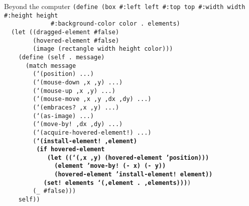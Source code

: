\begin{frame}{Beyond the computer}
  \tiny
  \texttt{(define (box \#:left left \#:top top \#:width width \#:height height\\
    \ \ \ \ \ \ \ \ \ \ \ \ \ \#:background-color color .\ elements)\\
    \ \ (let ((dragged-element \#false)\\
    \ \ \ \ \ \ \ \ (hovered-element \#false)\\
    \ \ \ \ \ \ \ \ (image (rectangle width height color)))\\
    \ \ \ \ (define (self .\ message)\\
    \ \ \ \ \ \ (match message\\
    \ \ \ \ \ \ \ \ (`(position) ...)\\
    \ \ \ \ \ \ \ \ (`(mouse-down ,x ,y) ...)\\
    \ \ \ \ \ \ \ \ (`(mouse-up ,x ,y) ...)\\
    \ \ \ \ \ \ \ \ (`(mouse-move ,x ,y ,dx ,dy) ...)\\
    \ \ \ \ \ \ \ \ (`(embraces?\ ,x ,y) ...)\\
    \ \ \ \ \ \ \ \ (`(as-image) ...)\\
    \ \ \ \ \ \ \ \ (`(move-by!\ ,dx ,dy) ...)\\
    \ \ \ \ \ \ \ \ (`(acquire-hovered-element!) ...)\\
    \ \ \ \ \ \ \ \ (\textbf{`(install-element!\ ,element)\\
    \ \ \ \ \ \ \ \ \ (if hovered-element\\
    \ \ \ \ \ \ \ \ \ \ \ \ (let ((`(,x ,y) (hovered-element 'position)))\\
    \ \ \ \ \ \ \ \ \ \ \ \ \ \ (element 'move-by!\ (- x) (- y))\\
    \ \ \ \ \ \ \ \ \ \ \ \ \ \ (hovered-element 'install-element!\ element))\\
    \ \ \ \ \ \ \ \ \ \ \ (set!\ elements `(,element .\ ,elements)))})\\
    \ \ \ \ \ \ \ \ (\_ \#false)))\\
    \ \ \ \ self))} \\
  \ \\ \ \\ \ \\ \ \\ \ \\ \ 
\end{frame}

